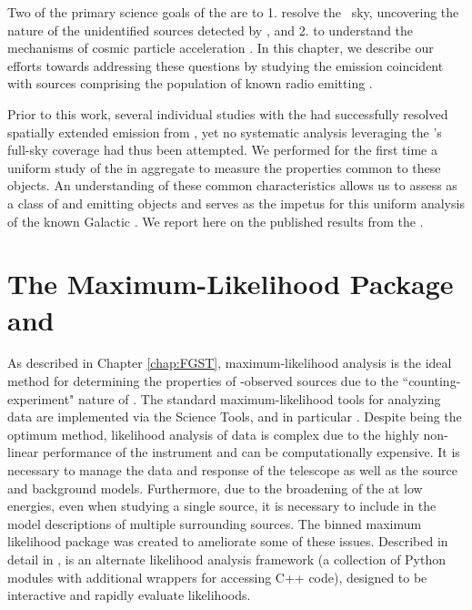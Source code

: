 {Two of the primary science goals of the \lat{}  are to 1. resolve the \gam~sky, uncovering the nature of the unidentified sources detected by \egret{}, and 2. to understand the mechanisms of cosmic particle acceleration \citep{atwood09}. In this chapter, we describe our efforts towards addressing these questions by studying the \gam{} emission coincident with sources comprising the population of known radio emitting \snrs{}.

Prior to this work, several individual studies with the \lat{} had successfully resolved spatially extended emission from \snrs{} \citep[and references therein]{3FGL}, yet no systematic analysis leveraging the \lat{}'s full-sky coverage had thus been attempted. We performed for the first time a uniform study of the \snrs{} in aggregate to measure the properties common to these objects. An understanding of these common characteristics allows us to assess \snrs{} as a class of \gam{} and \cray{} emitting objects and serves as the impetus for this uniform analysis of the known Galactic \snrs{}. We  report here on the published results from the \snrcat{} \citep{snrCat}.
 


\section{\label{snrcat:ptlk}The \ptlike{} Maximum-Likelihood Package and \srcs{}}

As described in Chapter \ref{chap:FGST}, maximum-likelihood analysis is the ideal method for determining the properties of \lat{}-observed sources due to the ``counting-experiment" nature of \FermiLat{}. The standard maximum-likelihood tools for analyzing \lat{} data are implemented via the \Fermi{} Science Tools, and in particular \gtlike{}.  Despite being the optimum method, likelihood analysis of \lat{} data is complex due to the highly non-linear performance of the instrument and can be computationally expensive. It is necessary to manage the data and response of the telescope as well as the source and background models. Furthermore, due to the broadening of the \psf{} at low energies, even when studying a single source, it is necessary to include in the model descriptions of multiple surrounding sources. The \ptlike{} binned maximum likelihood package was created to ameliorate some of these issues. Described in detail in \cite{Kerr10}, \ptlike{} is an alternate likelihood analysis framework (a collection of Python modules with additional wrappers for accessing C++ code), designed to be interactive and rapidly evaluate likelihoods.  

}
